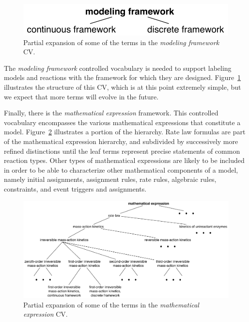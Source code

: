 \begin{figure}
  \centering
  \vspace*{-2ex}
  \includegraphics[scale = 0.9]{figs/sbo-framework}
  \vspace*{-2ex}
  \caption{Partial expansion of some of the terms in the
    \emph{modeling framework} CV.}
  \label{fig:expanded-framework}
\end{figure}
The \emph{modeling framework} controlled vocabulary is needed to
support labeling models and reactions with the framework for which
they are designed.  Figure~\ref{fig:expanded-framework}
illustrates the structure of this CV, which is at this point
extremely simple, but we expect that more terms will evolve in the
future.

Finally, there is the \emph{mathematical expression} framework.
This controlled vocabulary encompasses the various mathematical
expressions that constitute a model.
Figure~\ref{fig:sbo-math-expression} illustrates a portion of the
hierarchy.  Rate law formulas are part of the mathematical
expression hierarchy, and subdivided by successively more refined
distinctions until the leaf terms represent precise statements of
common reaction types.  Other types of mathematical expressions
are likely to be included in order to be able to characterize
other mathematical components of a model, namely initial
assignments, assignment rules, rate rules, algebraic rules,
constraints, and event triggers and assignments.

\begin{figure}[tbh]
  \centering
  \includegraphics[scale = 0.97]{figs/sbo-math-expression}
  \caption{Partial expansion of some of the terms in the \emph{mathematical
      expression} CV.}
  \label{fig:sbo-math-expression}
\end{figure}

